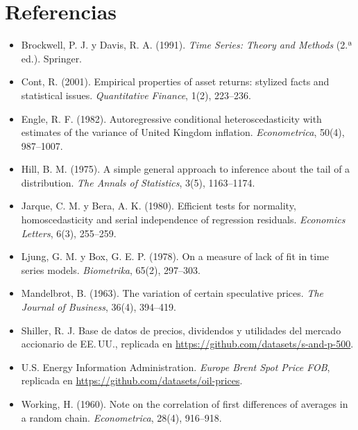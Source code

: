 \section*{Referencias}
\begin{itemize}[leftmargin=*]
  \item Brockwell, P. J. y Davis, R. A. (1991). \emph{Time Series: Theory and Methods} (2.ª ed.).
        Springer.
  \item Cont, R. (2001). Empirical properties of asset returns: stylized facts and statistical issues.
        \emph{Quantitative Finance}, 1(2), 223--236.
  \item Engle, R. F. (1982). Autoregressive conditional heteroscedasticity with estimates of the variance
        of United Kingdom inflation. \emph{Econometrica}, 50(4), 987--1007.
  \item Hill, B. M. (1975). A simple general approach to inference about the tail of a distribution.
        \emph{The Annals of Statistics}, 3(5), 1163--1174.
  \item Jarque, C. M. y Bera, A. K. (1980). Efficient tests for normality, homoscedasticity and serial
        independence of regression residuals. \emph{Economics Letters}, 6(3), 255--259.
  \item Ljung, G. M. y Box, G. E. P. (1978). On a measure of lack of fit in time series models.
        \emph{Biometrika}, 65(2), 297--303.
  \item Mandelbrot, B. (1963). The variation of certain speculative prices. \emph{The Journal of
        Business}, 36(4), 394--419.
  \item Shiller, R. J. Base de datos de precios, dividendos y utilidades del mercado accionario de
        EE.\,UU., replicada en \url{https://github.com/datasets/s-and-p-500}.
  \item U.S. Energy Information Administration. \emph{Europe Brent Spot Price FOB}, replicada en
        \url{https://github.com/datasets/oil-prices}.
  \item Working, H. (1960). Note on the correlation of first differences of averages in a random chain.
        \emph{Econometrica}, 28(4), 916--918.
\end{itemize}
